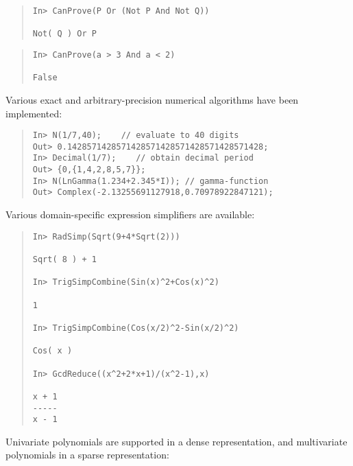 \documentclass{llncs}
\begin{document}
\begin{quote}\small\begin{verbatim}
In> CanProve(P Or (Not P And Not Q))

Not( Q ) Or P
\end{verbatim}\end{quote}

\begin{quote}\small\begin{verbatim}
In> CanProve(a > 3 And a < 2)

False
\end{verbatim}\end{quote}

Various exact and arbitrary-precision numerical algorithms have been
implemented:

\begin{quote}\small\begin{verbatim}
In> N(1/7,40);    // evaluate to 40 digits
Out> 0.1428571428571428571428571428571428571428;
In> Decimal(1/7);    // obtain decimal period
Out> {0,{1,4,2,8,5,7}};
In> N(LnGamma(1.234+2.345*I)); // gamma-function
Out> Complex(-2.13255691127918,0.70978922847121);
\end{verbatim}\end{quote}

Various domain-specific expression simplifiers are available:

\begin{quote}\small\begin{verbatim}
In> RadSimp(Sqrt(9+4*Sqrt(2)))

Sqrt( 8 ) + 1

In> TrigSimpCombine(Sin(x)^2+Cos(x)^2)

1

In> TrigSimpCombine(Cos(x/2)^2-Sin(x/2)^2)

Cos( x )

In> GcdReduce((x^2+2*x+1)/(x^2-1),x)

x + 1
-----
x - 1
\end{verbatim}\end{quote}

Univariate polynomials are supported in a dense representation, 
and multivariate polynomials in a sparse representation:
\end{document}
